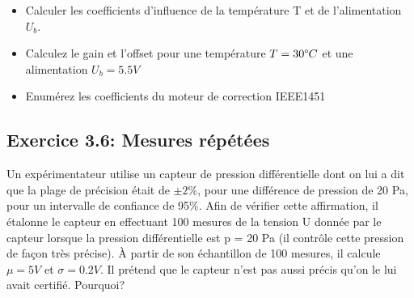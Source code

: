 \documentclass[main.tex]{subfiles}
\begin{document}
\begin{itemize}
    \item Calculer les coefficients d'influence de la température T et de l'alimentation $U_b$.
    \item Calculez le gain et l'offset pour une température $T=30 \degree C$ et une alimentation $U_b=5.5V$
    \item Enumérez les coefficients du moteur de correction IEEE1451
\end{itemize}

\subsection*{Exercice 3.6: Mesures répétées}

Un expérimentateur utilise un capteur de pression différentielle dont on lui a dit que la plage de précision était de $\pm 2\%$, pour une différence de pression de 20 Pa, pour un intervalle de confiance de 95\%. Afin de vérifier cette affirmation, il étalonne le capteur en effectuant 100 mesures de la tension U donnée par le capteur lorsque la pression différentielle est p = 20 Pa (il contrôle cette pression de façon très précise). À partir de son échantillon de 100 mesures, il calcule $\mu = 5V$ et $\sigma = 0.2 V$. Il prétend que le capteur n'est pas aussi précis qu'on le lui avait certifié. Pourquoi?

\fi
\end{document}
